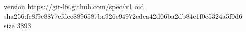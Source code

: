 version https://git-lfs.github.com/spec/v1
oid sha256:fc8f9c8877efdee8896587ba926e94972edea42d06ba2db84c1f0c5324a5f0d6
size 3893
